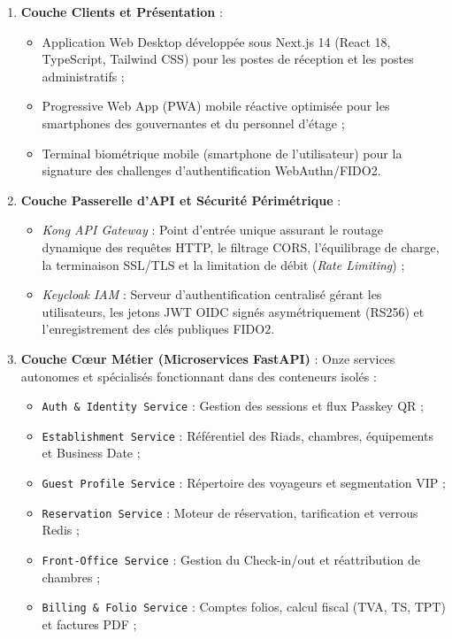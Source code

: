 \documentclass[12pt,a4paper,oneside]{report}
\begin{document}
\begin{enumerate}
    \item \textbf{Couche Clients et Présentation} : 
    \begin{itemize}
        \item Application Web Desktop développée sous Next.js 14 (React 18, TypeScript, Tailwind CSS) pour les postes de réception et les postes administratifs ;
        \item Progressive Web App (PWA) mobile réactive optimisée pour les smartphones des gouvernantes et du personnel d'étage ;
        \item Terminal biométrique mobile (smartphone de l'utilisateur) pour la signature des challenges d'authentification WebAuthn/FIDO2.
    \end{itemize}
    \item \textbf{Couche Passerelle d'API et Sécurité Périmétrique} :
    \begin{itemize}
        \item \textit{Kong API Gateway} : Point d'entrée unique assurant le routage dynamique des requêtes HTTP, le filtrage CORS, l'équilibrage de charge, la terminaison SSL/TLS et la limitation de débit (\textit{Rate Limiting}) ;
        \item \textit{Keycloak IAM} : Serveur d'authentification centralisé gérant les utilisateurs, les jetons JWT OIDC signés asymétriquement (RS256) et l'enregistrement des clés publiques FIDO2.
    \end{itemize}
    \item \textbf{Couche Cœur Métier (Microservices FastAPI)} : Onze services autonomes et spécialisés fonctionnant dans des conteneurs isolés :
    \begin{itemize}
        \item \texttt{Auth \& Identity Service} : Gestion des sessions et flux Passkey QR ;
        \item \texttt{Establishment Service} : Référentiel des Riads, chambres, équipements et Business Date ;
        \item \texttt{Guest Profile Service} : Répertoire des voyageurs et segmentation VIP ;
        \item \texttt{Reservation Service} : Moteur de réservation, tarification et verrous Redis ;
        \item \texttt{Front-Office Service} : Gestion du Check-in/out et réattribution de chambres ;
        \item \texttt{Billing \& Folio Service} : Comptes folios, calcul fiscal (TVA, TS, TPT) et factures PDF ;

\end{itemize}
\end{enumerate}
\end{document}
